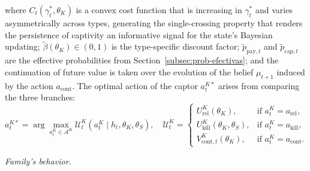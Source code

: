 \documentclass[pdflatex,sn-mathphys-ay]{sn-jnl}
\theoremstyle{plain}
\theoremstyle{definition}
\newcommand{\1}{\mathbf{1}}
\begin{document}
where $C_t(\gamma_t^\ast,\theta_K)$ is a convex cost function that is increasing in $\gamma_t^\ast$ and varies asymmetrically across types, generating the single-crossing property that renders the persistence of captivity an informative signal for the state's Bayesian updating; $\tilde{\beta}(\theta_K)\in(0,1)$ is the type-specific discount factor; $\tilde{p}_{\mathrm{pay},t}$ and $\tilde{p}_{\mathrm{cap},t}$ are the effective probabilities from Section~\ref{subsec:prob-efectivas}; and the continuation of future value is taken over the evolution of the belief $\mu_{t+1}$ induced by the action $a_{\mathrm{cont}}$. The optimal action of the captor $a_t^{K\ast}$ arises from comparing the three branches:
\begin{equation}
a_t^{K\ast}=\arg\max_{a_t^K\in\mathcal{A}^K}\mathcal{U}^K_t(a_t^K\mid h_t,\theta_K,\theta_S),\quad
\mathcal{U}^K_t=\begin{cases}U^K_{\mathrm{rel}}(\theta_K), & \text{if }a_t^K=a_{\mathrm{rel}},\\U^K_{\mathrm{kill}}(\theta_K,\theta_S), & \text{if }a_t^K=a_{\mathrm{kill}},\\V^K_{\mathrm{cont},t}(\theta_K), & \text{if }a_t^K=a_{\mathrm{cont}}.\end{cases}
\label{eq:k-argmax}
\end{equation}

\noindent\textit{Family's behavior.}
\end{document}
